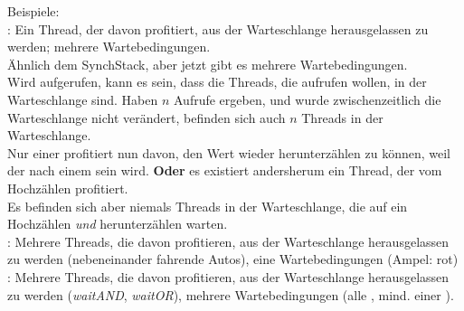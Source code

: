 \noindent
Beispiele:\\

\noindent
{}: Ein Thread, der davon profitiert, aus der Warteschlange herausgelassen zu werden; mehrere Wartebedingungen.\\
Ähnlich dem SynchStack, aber jetzt gibt es mehrere Wartebedingungen.\\
Wird  aufgerufen, kann es sein, dass die Threads, die  aufrufen wollen, in der Warteschlange sind.
Haben $n$ Aufrufe  ergeben, und wurde zwischenzeitlich die Warteschlange nicht verändert, befinden sich auch $n$ Threads in der Warteschlange.\\
Nur einer profitiert nun davon, den Wert wieder herunterzählen zu können, weil der  nach einem   sein wird.
\textbf{Oder} es existiert andersherum ein Thread, der vom Hochzählen profitiert.\\
Es befinden sich aber niemals Threads in der Warteschlange, die auf ein Hochzählen \textit{und} herunterzählen warten.\\

\noindent
{}: Mehrere Threads, die davon profitieren, aus der Warteschlange herausgelassen zu werden (nebeneinander fahrende Autos), eine Wartebedingungen (Ampel: rot)\\

\noindent
{}: Mehrere Threads, die davon profitieren, aus der Warteschlange herausgelassen zu werden (\textit{waitAND}, \textit{waitOR}), mehrere Wartebedingungen (alle , mind. einer ).







